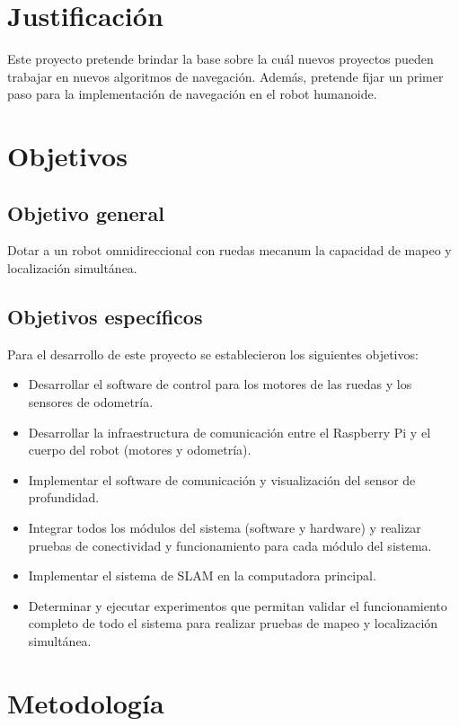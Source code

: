 \section{Justificación}
Este proyecto pretende brindar la base sobre la cuál nuevos proyectos pueden trabajar en nuevos algoritmos de navegación. Además, pretende fijar un primer paso para la implementación de navegación en el robot humanoide.

\section{Objetivos}

\subsection{Objetivo general}
Dotar a un robot omnidireccional con ruedas mecanum la capacidad de mapeo y localización simultánea.

\subsection{Objetivos específicos}
Para el desarrollo de este proyecto se establecieron los siguientes objetivos:

\begin{itemize} %
    \item Desarrollar el software de control para los motores de las ruedas y los sensores de odometría.
    \item Desarrollar la infraestructura de comunicación entre el Raspberry Pi y el cuerpo del robot (motores y odometría). \item Implementar el software de comunicación y visualización del sensor de profundidad.
    \item Integrar todos los módulos del sistema (software y hardware) y realizar pruebas de conectividad y funcionamiento para cada módulo del sistema.
    \item Implementar el sistema de SLAM en la computadora principal.
    \item Determinar y ejecutar experimentos que permitan validar el funcionamiento completo de todo el sistema para realizar pruebas de mapeo y localización simultánea.
\end{itemize}

\section{Metodología}
\label{metodología}

